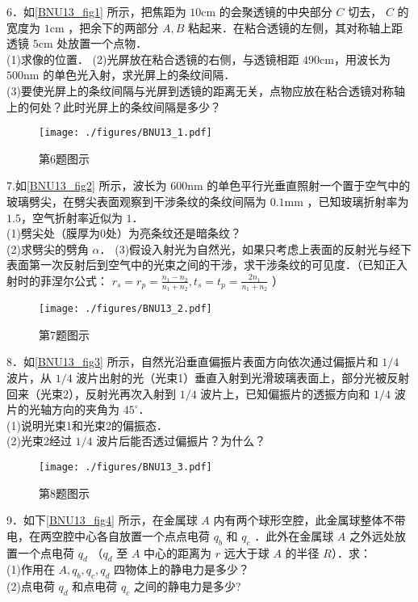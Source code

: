 6．如\autoref{BNU13_fig1} 所示，把焦距为 $10\mathrm{cm}$ 的会聚透镜的中央部分 $C$ 切去， $C$ 的宽度为 $1\mathrm{cm}$ ，把余下的两部分 $A,B$ 粘起来．在粘合透镜的左侧，其对称轴上距透镜 $5\mathrm{cm}$ 处放置一个点物．\\
(1)求像的位置．
(2)光屏放在粘合透镜的右侧，与透镜相距 $490\mathrm{cm}$，用波长为 $500\mathrm{nm}$ 的单色光入射，求光屏上的条纹间隔．\\
(3)要使光屏上的条纹间隔与光屏到透镜的距离无关，点物应放在粘合透镜对称轴上的何处？此时光屏上的条纹间隔是多少？
\begin{figure}[ht]
\centering
\texttt{[image: ./figures/BNU13\_1.pdf]}
\caption{第6题图示} \label{BNU13_fig1}
\end{figure}
7.如\autoref{BNU13_fig2} 所示，波长为 $600\mathrm{nm}$ 的单色平行光垂直照射一个置于空气中的玻璃劈尖，在劈尖表面观察到干涉条纹的条纹间隔为 $0.1\mathrm{mm}$ ，已知玻璃折射率为 $1.5$，空气折射率近似为 $1$．\\
(1)劈尖处（膜厚为0处）为亮条纹还是暗条纹？\\
(2)求劈尖的劈角 $\alpha$．
(3)假设入射光为自然光，如果只考虑上表面的反射光与经下表面第一次反射后到空气中的光束之间的干涉，求干涉条纹的可见度．（已知正入射时的菲涅尔公式： $r_s=r_p=\frac{n_1-n_2}{n_1+n_2},t_s=t_p=\frac{2n_1}{n_1+n_2}$ ）
\begin{figure}[ht]
\centering
\texttt{[image: ./figures/BNU13\_2.pdf]}
\caption{第7题图示} \label{BNU13_fig2}
\end{figure}
8．如\autoref{BNU13_fig3} 所示，自然光沿垂直偏振片表面方向依次通过偏振片和 $1/4$ 波片，从 $1/4$ 波片出射的光（光束1）垂直入射到光滑玻璃表面上，部分光被反射回来（光束2），反射光再次入射到 $1/4$ 波片上，已知偏振片的透振方向和 $1/4$ 波片的光轴方向的夹角为 $45^\circ$．\\
(1)说明光束1和光束2的偏振态．\\
(2)光束2经过 $1/4$ 波片后能否透过偏振片？为什么？
\begin{figure}[ht]
\centering
\texttt{[image: ./figures/BNU13\_3.pdf]}
\caption{第8题图示} \label{BNU13_fig3}
\end{figure}
9．如下\autoref{BNU13_fig4} 所示，在金属球 $A$ 内有两个球形空腔，此金属球整体不带电，在两空腔中心各自放置一个点点电荷 $q_b$ 和 $q_c$ ．此外在金属球 $A$ 之外远处放置一个点电荷 $q_d$ （$q_d$ 至 $A$ 中心的距离为 $r$ 远大于球 $A$ 的半径 $R$）．求：\\
(1)作用在 $A,q_b,q_c,q_d$ 四物体上的静电力是多少？\\
(2)点电荷 $q_d$ 和点电荷 $q_c$ 之间的静电力是多少?\\
